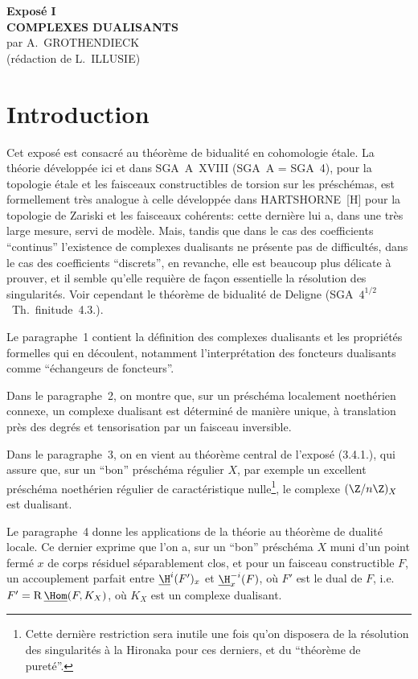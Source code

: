 

\begin{center}
{\Large \textbf{Exposé I}}\\[0.4em]
{\large \textbf{COMPLEXES DUALISANTS}}\\[0.3em]
par A.~GROTHENDIECK\\
(rédaction de L.~ILLUSIE)
\end{center}

\section*{Introduction}

Cet exposé est consacré au théorème de bidualité en cohomologie étale. La théorie développée ici et dans SGA~A~XVIII (SGA~A = SGA~4), pour la topologie étale et les faisceaux constructibles de torsion sur les préschémas, est formellement très analogue à celle développée dans HARTSHORNE~[H] pour la topologie de Zariski et les faisceaux cohérents: cette dernière lui a, dans une très large mesure, servi de modèle. Mais, tandis que dans le cas des coefficients ``continus'' l'existence de complexes dualisants ne présente pas de difficultés, dans le cas des coefficients ``discrets'', en revanche, elle est beaucoup plus délicate à prouver, et il semble qu'elle requière de façon essentielle la résolution des singularités. Voir cependant le théorème de bidualité de Deligne (SGA~$4^{1/2}$~Th.~finitude~4.3.).

Le paragraphe~1 contient la définition des complexes dualisants et les propriétés formelles qui en découlent, notamment l'interprétation des foncteurs dualisants comme ``échangeurs de foncteurs''.

Dans le paragraphe~2, on montre que, sur un préschéma localement noethérien connexe, un complexe dualisant est déterminé de manière unique, à translation près des degrés et tensorisation par un faisceau inversible.

Dans le paragraphe~3, on en vient au théorème central de l'exposé (3.4.1.), qui assure que, sur un ``bon'' préschéma régulier $X$, par exemple un excellent préschéma noethérien régulier de caractéristique nulle\footnote{Cette dernière restriction sera inutile une fois qu'on disposera de la résolution des singularités à la Hironaka pour ces derniers, et du ``théorème de pureté''.}, le complexe $(\Z/n\Z)_X$ est dualisant.

Le paragraphe~4 donne les applications de la théorie au théorème de dualité locale. Ce dernier exprime que l'on a, sur un ``bon'' préschéma $X$ muni d'un point fermé $x$ de corps résiduel séparablement clos, et pour un faisceau constructible $F$, un accouplement parfait entre $\underline{\H}^i(F')_x$ et $\underline{\H}^{-i}_x(F)$, où $F'$ est le dual de $F$, i.e.\ $F' = \mathrm{R}\,\underline{\Hom}(F,K_X)$, où $K_X$ est un complexe dualisant.

